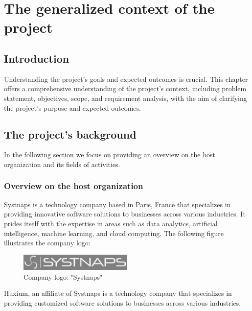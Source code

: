 \graphicspath{{./assets/}}
\setcounter{mtc}{1}
\chapter{The generalized context of the project }


\section*{Introduction}

\hspace{7mm}Understanding the project's goals and expected outcomes is crucial. This chapter offers a comprehensive understanding of the project's context, including problem statement, objectives, scope, and requirement analysis, with the aim of clarifying the project's purpose and expected outcomes.

\section{The project's background}
\hspace{7mm}In the following section we focus on providing an overview on the host organization and its fields of activities. 
\subsection{Overview on the host organization  }

\hspace{7mm}Systnaps is a technology company based in Paris, France that specializes in providing innovative software solutions to businesses across various industries. It prides itself with the expertise in areas such as data analytics, artificial intelligence, machine learning, and cloud computing. The following figure illustrates the company logo: 

\begin{figure}[!ht]\centering
\includegraphics[width=0.5\textwidth,angle=00]{assets/fa.png}
\caption{Company logo: "Systnaps"}
\end{figure}

\hspace{7mm}Huxium, an affiliate of Systnaps is a technology company that specializes in providing customized software solutions to businesses across various industries. 


